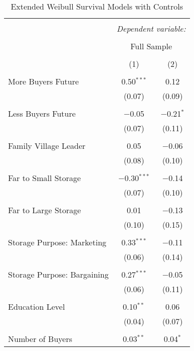 
\begin{table}[!htbp] \centering 
  \caption{Extended Weibull Survival Models with Controls} 
  \label{} 
\begin{tabular}{@{\extracolsep{5pt}}lcc} 
\\[-1.8ex]\hline 
\hline \\[-1.8ex] 
 & \multicolumn{2}{c}{\textit{Dependent variable:}} \\ 
\cline{2-3} 
\\[-1.8ex] & \multicolumn{2}{c}{Full Sample} \\ 
\\[-1.8ex] & (1) & (2)\\ 
\hline \\[-1.8ex] 
 More Buyers Future & 0.50$^{***}$ & 0.12 \\ 
  & (0.07) & (0.09) \\ 
  & & \\ 
 Less Buyers Future & $-$0.05 & $-$0.21$^{*}$ \\ 
  & (0.07) & (0.11) \\ 
  & & \\ 
 Family Village Leader & 0.05 & $-$0.06 \\ 
  & (0.08) & (0.10) \\ 
  & & \\ 
 Far to Small Storage & $-$0.30$^{***}$ & $-$0.14 \\ 
  & (0.07) & (0.10) \\ 
  & & \\ 
 Far to Large Storage & 0.01 & $-$0.13 \\ 
  & (0.10) & (0.15) \\ 
  & & \\ 
 Storage Purpose: Marketing & 0.33$^{***}$ & $-$0.11 \\ 
  & (0.06) & (0.14) \\ 
  & & \\ 
 Storage Purpose: Bargaining & 0.27$^{***}$ & $-$0.05 \\ 
  & (0.06) & (0.11) \\ 
  & & \\ 
 Education Level & 0.10$^{**}$ & 0.06 \\ 
  & (0.04) & (0.07) \\ 
  & & \\ 
 Number of Buyers & 0.03$^{**}$ & 0.04$^{*}$ \\ 

\end{tabular}
\end{table}
